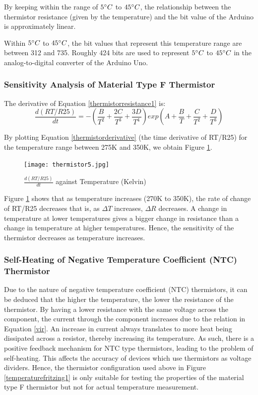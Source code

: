 By keeping within the range of $5\degree C$ to $45\degree C$, the relationship between the thermistor resistance (given by the temperature) and the bit value of the Arduino is approximately linear.

Within $5\degree C$ to $45\degree C$, the bit values that represent this temperature range are between 312 and 735. Roughly 424 bits are used to represent $5\degree C$ to $45\degree C$ in the analog-to-digital converter of the Arduino Uno. 

\subsubsection{Sensitivity Analysis of Material Type F Thermistor}

The derivative of Equation \ref{thermistorresistance1} is: 
\begin{equation}
	\frac{d(RT/R25)}{dt}=-\left (\frac{B}{T^2}+\frac{2C}{T^3}+\frac{3D}{T^4} \right ) exp(A+\frac{B}{T}+\frac{C}{T^2}+\frac{D}{T^3}) 
	\label{thermistorderivative}
\end{equation}

By plotting Equation \ref{thermistorderivative} (the time derivative of RT/R25) for the temperature range between 275K and 350K, we obtain Figure \ref{dRTR25dttemperature}. 

\begin{figure}[H]
	\centering
	\texttt{[image: thermistor5.jpg]}
	\caption{$\frac{d(RT/R25)}{dt}$ against Temperature (Kelvin)}
	\label{dRTR25dttemperature}
\end{figure}

Figure \ref{dRTR25dttemperature} shows that as temperature increases (270K to 350K), the rate of change of RT/R25 decreases that is, as $\Delta T$ increases, $\Delta R$ decreases.  A change in temperature at lower temperatures gives a bigger change in resistance than a change in temperature at higher temperatures. Hence, the sensitivity of the thermistor decreases as temperature increases. 

\subsubsection{Self-Heating of Negative Temperature Coefficient (NTC) Thermistor}

Due to the nature of negative temperature coefficient (NTC) thermistors, it can be deduced that the higher the temperature, the lower the resistance of the thermistor. By having a lower resistance with the same voltage across the component, the current through the component increases due to the relation in Equation \ref{vir}. An increase in current always translates to more heat being dissipated across a resistor, thereby increasing its temperature. As such, there is a positive feedback mechanism for NTC type thermistors, leading to the problem of self-heating. This affects the accuracy of devices which use thermistors as voltage dividers. Hence, the thermistor configuration used above in Figure \ref{temperaturefritzing1} is only suitable for testing the properties of the material type F thermistor but not for actual temperature measurement.  

